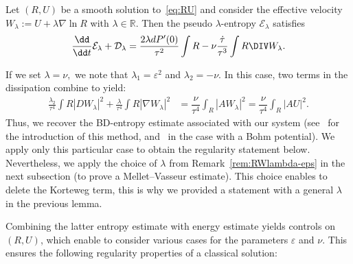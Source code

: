 \begin{lemm}\label{lem:pseudo-lambda-entropy}
Let $(R,U)$ be a smooth solution to~\eqref{eq:RU} and consider the effective velocity $W_\lambda := U + \lambda \nabla \ln R$ with $\lambda \in \mathbb R$. Then the pseudo $\lambda$-entropy $\mathcal E_{\lambda}$ satisfies
\[
\frac{\dd }{\dd t} \mathcal E_{\lambda} + \mathcal D_{\lambda} = \frac{2 \lambda d P'(0)}{\tau^2} \int R - \nu \frac{\dot \tau}{\tau^3} \int R \DIV W_\lambda.
\]
\end{lemm}

\begin{rema}
If we set $\lambda = \nu,$ we note that $\lambda_1 = \varepsilon^2$ and $\lambda_2=-\nu.$ In this case, two terms in the dissipation combine to yield:
\[
\begin{aligned}
\frac{\lambda_2}{\tau^4} \int R |D W_\lambda|^2 +
\frac{\lambda}{\tau^4} \int R |\nabla W_\lambda|^2 & = \dfrac{\nu}{\tau^4} \int_{R} |A W_{\lambda}|^2 = \dfrac{\nu}{\tau^4} \int_{R} |A U|^2.
\end{aligned}
\]
Thus, we recover the BD-entropy estimate associated with our system (see~\cite{BD04,Bre-De-CKL-03} for the introduction of this method, and~\cite{VasseurYu} in the case with a Bohm potential). We apply only this particular case to obtain the regularity statement below. Nevertheless, we apply the choice of $\lambda$ from Remark~\ref{rem:RWlambda-eps} in the next subsection (to prove a Mellet--Vasseur estimate). This choice enables to delete the Korteweg term, this is why we provided a statement with a general $\lambda$ in the previous lemma.
\end{rema}

Combining the latter entropy estimate with energy estimate yields controls on $(R,U)$, which enable to consider various cases for the parameters $\varepsilon$ and $\nu.$ This ensures the following regularity properties of a classical solution:

